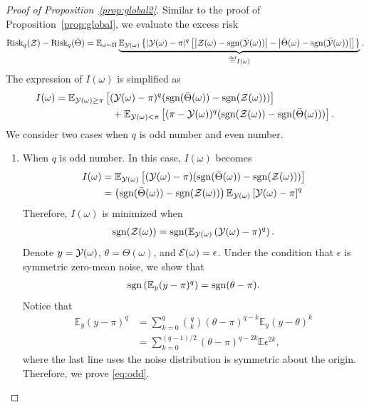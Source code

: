 \documentclass[twoside,11pt]{article}
\theoremstyle{plain}
\theoremstyle{definition}
\newcommand*{\KeepStyleUnderBrace}[1]{%
  \mathop{%
    \mathchoice
    {\underbrace{\displaystyle#1}}%
    {\underbrace{\textstyle#1}}%
    {\underbrace{\scriptstyle#1}}%
    {\underbrace{\scriptscriptstyle#1}}%
  }\limits
}
\def\sign{\textup{sgn}}
\def\risk{\textup{Risk}}
\begin{document}
\begin{proof}[Proof of Proposition~\ref{prop:global2}]
Similar to the proof of Proposition~\ref{prop:global}, we evaluate the excess risk 
\begin{equation}\label{eq:risk}
\risk_q(\tZ)- \risk_q(\bar \Theta) = \mathbb{E}_{\omega\sim \Pi}\KeepStyleUnderBrace{\mathbb{E}_{\tY(\omega)}\left\{|\tY(\omega)-\pi|^q\left[\left|\tZ(\omega)-\sign(\bar \tY(\omega)) \right|-\left|\bar\Theta(\omega)-\sign(\bar \tY(\omega))\right|\right]\right\}}_{\stackrel{\text{def}}{=}I(\omega)}.
\end{equation}
The expression of $I(\omega)$ is simplified as
\begin{align}\label{eq:I}
I(\omega)&= \mathbb{E}_{\tY(\omega)\geq \pi}\left[ (\tY(\omega)-\pi)^q(\sign(\bar \Theta(\omega))-\sign(\tZ(\omega)))\right]\\&\hspace{2cm}+\mathbb{E}_{\tY(\omega)< \pi}\left[ (\pi-\tY(\omega))^q(\sign(\tZ(\omega))-\sign(\bar \Theta(\omega)))\right].
\end{align}
We consider two cases when $q$ is odd number and even number.
\begin{enumerate}
    \item When $q$ is odd number. In this case, $I(\omega)$ becomes
    \begin{align}
        I(\omega)  &=  \mathbb{E}_{\tY(\omega)}\left[(\tY(\omega)-\pi)(\sign(\bar\Theta(\omega))-\sign(\tZ(\omega)))\right]\\&=
        \left(\sign(\bar\Theta(\omega))-\sign(\tZ(\omega))\right)\mathbb{E}_{\tY(\omega)}\left[\tY(\omega)-\pi\right]^q
    \end{align}
    Therefore, $I(\omega)$ is minimized when
    \begin{align}\label{eq:oddt}
        \sign(\tZ(\omega)) = \sign(\mathbb{E}_{\tY(\omega)}\left(\tY(\omega)-\pi)^q\right).
    \end{align}
    Denote $y=\mathcal{Y}(\omega)$, $\theta = \Theta(\omega)$, and $\mathcal{E}(\omega) = \epsilon$.
    Under the condition that $\epsilon$ is symmetric zero-mean noise, we show that
    \begin{align}\label{eq:odd}
        \sign\left(\mathbb{E}_y(y-\pi)^q\right) = \sign(\theta-\pi).
    \end{align}
    Notice that 
    \begin{align}
        \mathbb{E}_y(y-\pi)^q & = \sum_{k = 0}^q {q\choose k}(\theta-\pi)^{q-k}\mathbb{E}_y(y-\theta)^k\\&= \sum_{k=0}^{(q-1)/2}(\theta-\pi)^{q-2k}\mathbb{E}\epsilon^{2k},
    \end{align}
    where the last line uses the noise distribution is symmetric about the  origin. Therefore, we prove  \eqref{eq:odd}.
    

\end{enumerate}
\end{proof}
\end{document}
